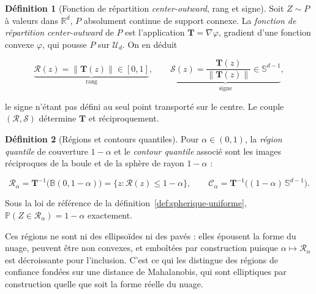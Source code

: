 \documentclass[11pt,a4paper]{article}
\theoremstyle{definition}
\newtheorem{definition}{Définition}[section]
\theoremstyle{remark}
\newcommand{\R}{\mathbb{R}}
\newcommand{\PP}{\mathbb{P}}
\newcommand{\Unif}{\mathcal{U}}
\newcommand{\Bball}{\mathbb{B}}
\newcommand{\Sphere}{\mathbb{S}}
\newcommand{\norm}[1]{\left\lVert #1 \right\rVert}
\newcommand{\Tmap}{\mathbf{T}}
\begin{document}
\bigskip

\begin{definition}[Fonction de répartition \emph{center-outward}, rang et signe]
  \label{def:center-outward}
  Soit $Z \sim P$ à valeurs dans $\R^d$, $P$ absolument continue de support connexe. La
  \emph{fonction de répartition center-outward} de $P$ est l'application
  $\Tmap = \nabla\varphi$, gradient d'une fonction convexe $\varphi$, qui pousse $P$ sur
  $\Unif_d$. On en déduit

  \medskip

  \[
    \underbrace{\mathcal{R}(z) = \norm{\Tmap(z)} \in [0,1]}_{\text{rang}},
    \qquad
    \underbrace{\mathcal{S}(z) = \frac{\Tmap(z)}{\norm{\Tmap(z)}} \in \Sphere^{d-1}}_{\text{signe}},
  \]

  \bigskip

  le signe n'étant pas défini au seul point transporté sur le centre. Le couple
  $(\mathcal{R}, \mathcal{S})$ détermine $\Tmap$ et réciproquement.
\end{definition}

\bigskip

\begin{definition}[Régions et contours quantiles]
  \label{def:regions-quantiles}
  Pour $\alpha \in (0,1)$, la \emph{région quantile} de couverture $1-\alpha$ et le
  \emph{contour quantile} associé sont les images réciproques de la boule et de la sphère
  de rayon $1-\alpha$ :

  \medskip

  \[
    \mathcal{R}_\alpha = \Tmap^{-1}\big(\Bball(0, 1-\alpha)\big)
    = \{ z : \mathcal{R}(z) \le 1-\alpha \},
    \qquad
    \mathcal{C}_\alpha = \Tmap^{-1}\big((1-\alpha)\,\Sphere^{d-1}\big).
  \]

  \bigskip

  Sous la loi de référence de la définition~\ref{def:spherique-uniforme},
  $\PP(Z \in \mathcal{R}_\alpha) = 1-\alpha$ exactement.
\end{definition}

\bigskip

Ces régions ne sont ni des ellipsoïdes ni des pavés : elles épousent la forme du nuage,
peuvent être non convexes, et emboîtées par construction puisque $\alpha \mapsto
\mathcal{R}_\alpha$ est décroissante pour l'inclusion. C'est ce qui les distingue des
régions de confiance fondées sur une distance de Mahalanobis, qui sont elliptiques par
construction quelle que soit la forme réelle du nuage.

\bigskip
\end{document}
